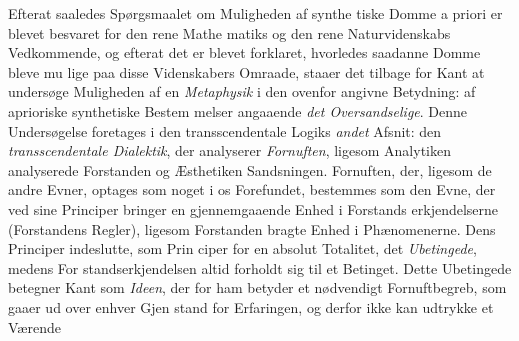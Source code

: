 \documentclass[12pt,a4paper]{book}
\begin{document}
Efterat saaledes Spørgsmaalet om Muligheden af synthe\-%
tiske Domme a priori er blevet besvaret for den rene Mathe\-%
matiks og den rene Naturvidenskabs Vedkommende, og efterat
det er blevet forklaret, hvorledes saadanne Domme bleve mu\-%
lige paa disse Videnskabers Omraade, staaer det tilbage for
Kant at undersøge Muligheden af en \emph{Metaphysik} i den
ovenfor angivne Betydning: af aprioriske synthetiske Bestem\-%
melser angaaende \emph{det Oversandselige}. Denne Undersøgelse
foretages i den transscendentale Logiks \emph{andet} Afsnit: den
\emph{transscendentale Dialektik}, der analyserer \emph{Fornuften},
ligesom Analytiken analyserede Forstanden og Æsthetiken
Sandsningen. Fornuften, der, ligesom de andre Evner, optages
som noget i os Forefundet, bestemmes som den Evne, der ved
sine Principer bringer en gjennemgaaende Enhed i Forstands\-%
erkjendelserne (Forstandens Regler), ligesom Forstanden bragte
Enhed i Phænomenerne. Dens Principer indeslutte, som Prin\-%
ciper for en absolut Totalitet, det \emph{Ubetingede}, medens For\-%
standserkjendelsen altid forholdt sig til et Betinget. Dette
Ubetingede betegner Kant som \emph{Ideen}, der for ham betyder
et nødvendigt Fornuftbegreb, som gaaer ud over enhver Gjen\-%
stand for Erfaringen, og derfor ikke kan udtrykke et Værende
\end{document}
